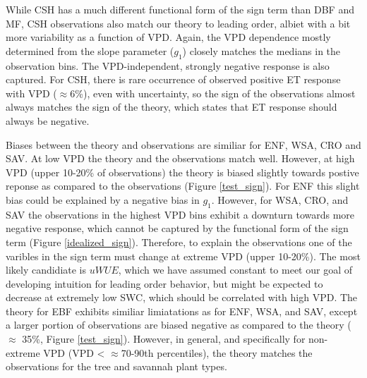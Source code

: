 \documentclass[draft,linenumbers]{agujournal}
\begin{document}
While CSH has a much different functional form of the sign term than
DBF and MF, CSH observations also match our theory to leading order,
albiet with a bit more variability as a function of VPD. Again, the
VPD dependence mostly determined from the slope parameter ($g_1$)
closely matches the medians in the observation bins. The
VPD-independent, strongly negative response is also captured. For CSH,
there is rare occurrence of observed positive ET response with VPD
($\approx 6$\%), even with uncertainty, so the sign of the
observations almost always matches the sign of the theory, which
states that ET response should always be negative.

Biases between the theory and observations are similiar for ENF, WSA,
CRO and SAV. At low VPD the theory and the observations match
well. However, at high VPD (upper 10-20\% of observations) the theory
is biased slightly towards postive reponse as compared to the
observations (Figure \ref{test_sign}). For ENF this slight bias could
be explained by a negative bias in $g_1$. However, for WSA, CRO, and
SAV the observations in the highest VPD bins exhibit a downturn
towards more negative response, which cannot be captured by the
functional form of the sign term (Figure
\ref{idealized_sign}). Therefore, to explain the observations one of
the varibles in the sign term must change at extreme VPD (upper
10-20\%). The most likely candidiate is $uWUE$, which we have assumed
constant to meet our goal of developing intuition for leading order
behavior, but might be expected to decrease at extremely low SWC,
which should be correlated with high VPD. The theory for EBF exhibits
similiar limiatations as for ENF, WSA, and SAV, except a larger
portion of observations are biased negative as compared to the theory
($\approx$ 35\%, Figure \ref{test_sign}). However, in general, and
specifically for non-extreme VPD (VPD < $\approx$70-90th percentiles), the theory matches the observations
for the tree and savannah plant types.
\end{document}
